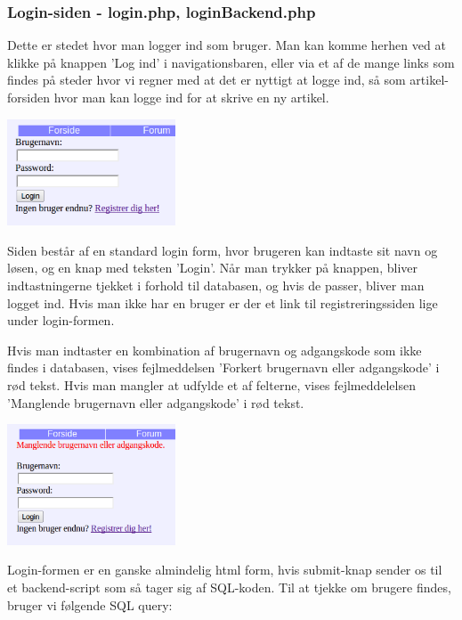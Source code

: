 \documentclass{article}
\begin{document}
\subsubsection[Login-siden]{Login-siden - login.php, loginBackend.php}
Dette er stedet hvor man logger ind som bruger. Man kan komme herhen ved at klikke på knappen 'Log ind' i navigationsbaren, eller via et af de mange links som findes på steder hvor vi regner med at det er nyttigt at logge ind, så som artikel-forsiden hvor man kan logge ind for at skrive en ny artikel.

\begin{center}
\includegraphics[width=50mm]{mi07.png}
\end{center}

Siden består af en standard login form, hvor brugeren kan indtaste sit navn og løsen, og en knap med teksten 'Login'. Når man trykker på knappen, bliver indtastningerne tjekket i forhold til databasen, og hvis de passer, bliver man logget ind. Hvis man ikke har en bruger er der et link til registreringssiden lige under login-formen.

Hvis man indtaster en kombination af brugernavn og adgangskode som ikke findes i databasen, vises fejlmeddelsen 'Forkert brugernavn eller adgangskode' i rød tekst. Hvis man mangler at udfylde et af felterne, vises fejlmeddelelsen 'Manglende brugernavn eller adgangskode' i rød tekst. 

\begin{center}
\includegraphics[width=50mm]{mi09.png}
\end{center}

Login-formen er en ganske almindelig html form, hvis submit-knap sender os til et backend-script som så tager sig af SQL-koden. Til at tjekke om brugere findes, bruger vi følgende SQL query:
\end{document}
